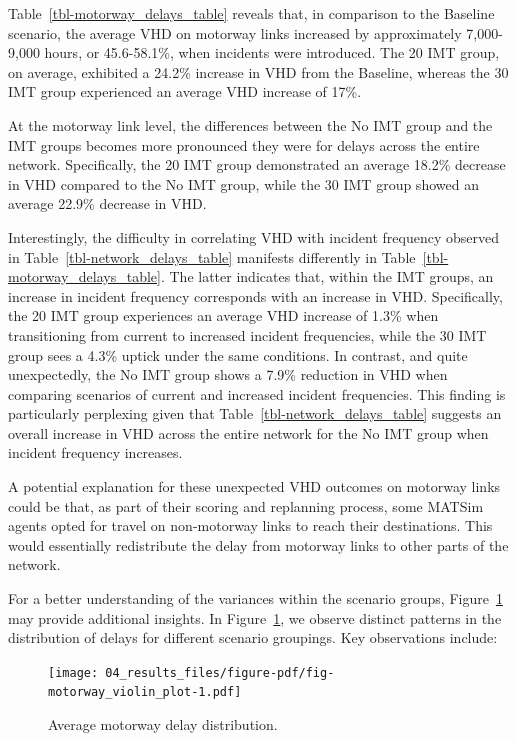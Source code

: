 \documentclass[fancy, oneside, mastersfancy, ms]{byuthesis}
\begin{document}
Table~\ref{tbl-motorway_delays_table} reveals that, in comparison to the
Baseline scenario, the average VHD on motorway links increased by
approximately 7,000-9,000 hours, or 45.6-58.1\%, when incidents were
introduced. The 20 IMT group, on average, exhibited a 24.2\% increase in
VHD from the Baseline, whereas the 30 IMT group experienced an average
VHD increase of 17\%.

At the motorway link level, the differences between the No IMT group and
the IMT groups becomes more pronounced they were for delays across the
entire network. Specifically, the 20 IMT group demonstrated an average
18.2\% decrease in VHD compared to the No IMT group, while the 30 IMT
group showed an average 22.9\% decrease in VHD.

Interestingly, the difficulty in correlating VHD with incident frequency
observed in Table~\ref{tbl-network_delays_table} manifests differently
in Table~\ref{tbl-motorway_delays_table}. The latter indicates that,
within the IMT groups, an increase in incident frequency corresponds
with an increase in VHD. Specifically, the 20 IMT group experiences an
average VHD increase of 1.3\% when transitioning from current to
increased incident frequencies, while the 30 IMT group sees a 4.3\%
uptick under the same conditions. In contrast, and quite unexpectedly,
the No IMT group shows a 7.9\% reduction in VHD when comparing scenarios
of current and increased incident frequencies. This finding is
particularly perplexing given that Table~\ref{tbl-network_delays_table}
suggests an overall increase in VHD across the entire network for the No
IMT group when incident frequency increases.

A potential explanation for these unexpected VHD outcomes on motorway
links could be that, as part of their scoring and replanning process,
some MATSim agents opted for travel on non-motorway links to reach their
destinations. This would essentially redistribute the delay from
motorway links to other parts of the network.

For a better understanding of the variances within the scenario groups,
Figure~\ref{fig-motorway_violin_plot} may provide additional insights.
In Figure~\ref{fig-motorway_violin_plot}, we observe distinct patterns
in the distribution of delays for different scenario groupings. Key
observations include:

\begin{figure}

{\centering \texttt{[image: 04\_results\_files/figure-pdf/fig-motorway\_violin\_plot-1.pdf]}

}

\caption{\label{fig-motorway_violin_plot}Average motorway delay
distribution.}

\end{figure}
\end{document}
